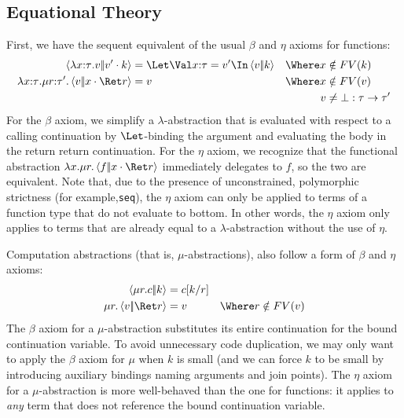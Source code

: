 \documentclass{article}
\begin{document}
\subsection{Equational Theory}

First, we have the sequent equivalent of the usual $\beta$ and $\eta$ axioms for
functions:
\begin{align*}
  \cut{\fn{\ann{x}{\ty}} \tm}{\app{\tm'}{\ko}}
  &=
  \Let \nonrec{\bindv{\ann{x}{\ty}}{\tm'}} \In \cut{\tm}{\ko}
  &
  \Where
  x &\notin FV(\ko)
  \\
  \fn{\ann{x}{\ty}}\comp{\ann{r}{\ty'}} \cut{\tm}{\app{x}{\ret r}}
  &=
  \tm
  &
  \Where
  x &\notin FV(\tm)
  \\
  &&
  \tm &\neq \bot : \ty \to \ty'
\end{align*}
For the $\beta$ axiom, we simplify a $\lambda$-abstraction that is evaluated
with respect to a calling continuation by $\Let$-binding the argument and
evaluating the body in the return return continuation.  For the $\eta$ axiom, we
recognize that the functional abstraction
$\fn{x}\comp{r}\cut{f}{\app{x}{\ret r}}$ immediately delegates to $f$, so the
two are equivalent.  Note that, due to the presence of unconstrained,
polymorphic strictness (for example,\texttt{seq}), the $\eta$ axiom can only be
applied to terms of a function type that do not evaluate to bottom.  In other
words, the $\eta$ axiom only applies to terms that are already equal to a
$\lambda$-abstraction without the use of $\eta$.

Computation abstractions (that is, $\mu$-abstractions), also follow a form of
$\beta$ and $\eta$ axioms:
\begin{align*}
  \cut{\comp{r}\cmd}{\ko}
  &=
  \cmd\subst{r}{\ko}
  \\
  \comp{r}\cut{\tm}{\ret r}
  &=
  \tm
  &
  \Where
  r \notin FV(\tm)
\end{align*}
The $\beta$ axiom for a $\mu$-abstraction substitutes its entire continuation
for the bound continuation variable.  To avoid unnecessary code duplication, we
may only want to apply the $\beta$ axiom for $\mu$ when $k$ is small (and we can
force $k$ to be small by introducing auxiliary bindings naming arguments and
join points).  The $\eta$ axiom for a $\mu$-abstraction is more well-behaved
than the one for functions: it applies to \emph{any} term that does not
reference the bound continuation variable.
\end{document}
